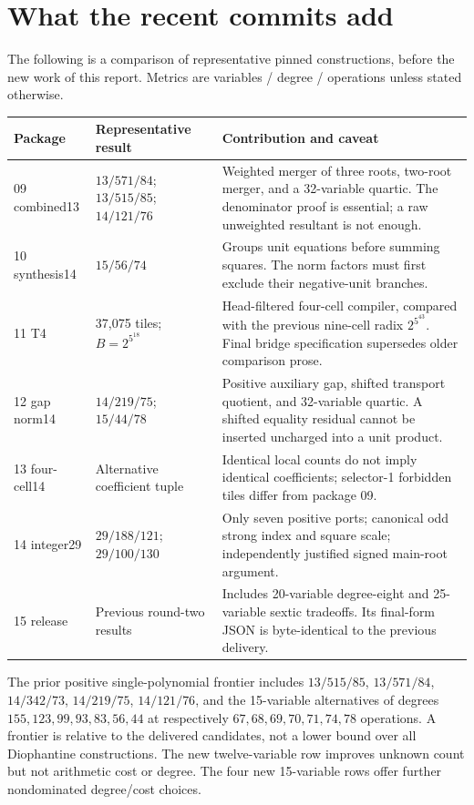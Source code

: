 \documentclass[11pt]{article}
\begin{document}
\section{What the recent commits add}

The following is a comparison of representative pinned constructions, before the new work of this report. Metrics are variables / degree / operations unless stated otherwise.
\begin{longtable}{@{}p{.15\linewidth}p{.32\linewidth}p{.46\linewidth}@{}}
\toprule Package & Representative result & Contribution and caveat\\\midrule\endhead
09 combined13 & $13/571/84$; $13/515/85$; $14/121/76$ & Weighted merger of three roots, two-root merger, and a 32-variable quartic. The denominator proof is essential; a raw unweighted resultant is not enough.\\
10 synthesis14 & $15/56/74$ & Groups unit equations before summing squares. The norm factors must first exclude their negative-unit branches.\\
11 T4 & 37,075 tiles; $B=2^{5^{18}}$ & Head-filtered four-cell compiler, compared with the previous nine-cell radix $2^{5^{43}}$. Final bridge specification supersedes older comparison prose.\\
12 gap norm14 & $14/219/75$; $15/44/78$ & Positive auxiliary gap, shifted transport quotient, and 32-variable quartic. A shifted equality residual cannot be inserted uncharged into a unit product.\\
13 four-cell14 & Alternative coefficient tuple & Identical local counts do not imply identical coefficients; selector-1 forbidden tiles differ from package 09.\\
14 integer29 & $29/188/121$; $29/100/130$ & Only seven positive ports; canonical odd strong index and square scale; independently justified signed main-root argument.\\
15 release & Previous round-two results & Includes 20-variable degree-eight and 25-variable sextic tradeoffs. Its final-form JSON is byte-identical to the previous delivery.\\
\bottomrule
\end{longtable}

The prior positive single-polynomial frontier includes $13/515/85$, $13/571/84$, $14/342/73$, $14/219/75$, $14/121/76$, and the 15-variable alternatives of degrees $155,123,99,93,83,56,44$ at respectively $67,68,69,70,71,74,78$ operations. A frontier is relative to the delivered candidates, not a lower bound over all Diophantine constructions. The new twelve-variable row improves unknown count but not arithmetic cost or degree. The four new 15-variable rows offer further nondominated degree/cost choices.
\end{document}
